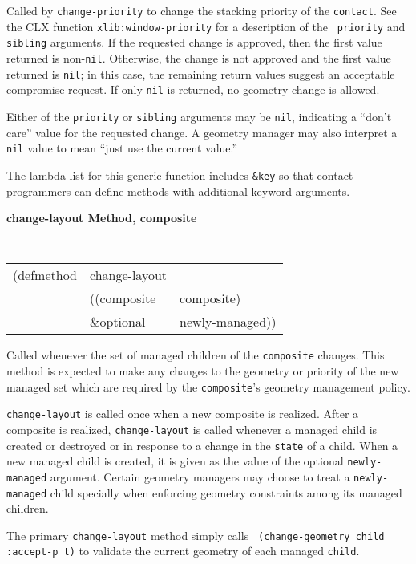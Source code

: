\begin{flushright} \parbox[t]{6.125in}{
Called by {\tt change-priority}
to change the stacking priority of the {\tt contact}.
See the CLX function {\tt xlib:window-priority} for a description of the {\tt
priority} and {\tt sibling} arguments.
If the
requested change is approved, then the first value returned
is non-{\tt nil}.  Otherwise, the change is not approved and the first  value returned is
{\tt nil}; in this case, the remaining return values suggest an acceptable
compromise request.
If only {\tt nil} is returned, no geometry change is allowed.

Either of the {\tt priority} or {\tt sibling} 
arguments may be {\tt nil}, indicating a ``don't care'' value for the requested
change. A geometry manager may also interpret a {\tt nil} value to mean ``just
use the current value.''


The lambda list for this generic function includes {\tt \&key} so that contact
programmers can define methods with additional keyword arguments.
}\end{flushright}

{\samepage
{\large {\bf change-layout \hfill Method, composite}}
\begin{flushright} \parbox[t]{6.125in}{
\tt
\begin{tabular}{lll}
\raggedright
(defmethod & change-layout & \\
& ((composite  &composite) \\
&  \&optional & newly-managed))
\end{tabular}
\rm

}\end{flushright}}

\begin{flushright} \parbox[t]{6.125in}{
Called whenever the set of managed children of the {\tt composite} changes. This
method is expected to make any changes to the geometry or priority of the new
managed set which are required by the {\tt composite}'s geometry management
policy. 

{\tt change-layout} is called once when a new composite is realized. After a
composite is realized, {\tt change-layout} is called whenever a managed child is
created or destroyed or in response to a change in the {\tt state} of a child.
When a new managed child is created, it is given as the value of the optional
{\tt newly-managed} argument. Certain geometry managers may choose to treat a
{\tt newly-managed} child specially when enforcing geometry constraints among
its managed children.

The primary {\tt change-layout} method simply calls {\tt
(change-geometry child :accept-p t)} to validate the current geometry of each
managed {\tt child}.

}\end{flushright}

